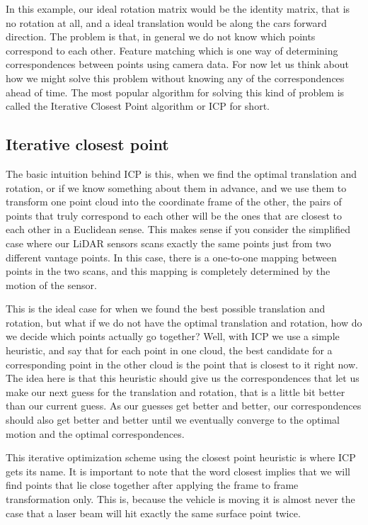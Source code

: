 In this example, our ideal rotation matrix would be the identity matrix, that is no rotation at all, and a ideal translation would be along the cars forward direction. The problem is
that, in general we do not know which points
correspond to each other.  Feature matching which is one way of determining correspondences between
points using camera data. For now let us think
about how we might solve this problem without knowing any of the correspondences
ahead of time. The most popular algorithm for solving this kind of
problem is called the Iterative Closest Point
algorithm or ICP for short. 

\subsection{Iterative closest point}

The basic intuition behind ICP is this, when we find the optimal
translation and rotation, or if we know something
about them in advance, and we use them to transform one point cloud into the
coordinate frame of the other, the pairs of points that truly correspond to each other will be the ones that are closest to each other in a Euclidean sense. This makes sense if you consider the simplified case where our LiDAR sensors scans exactly the same points just from two different
vantage points. In this case, there is a one-to-one mapping between points
in the two scans, and this mapping is completely determined by the motion
of the sensor. 

This is  the ideal case for when we found the best possible
translation and rotation, but what if we do not have the optimal translation
and rotation, how do we decide which points
actually go together? Well, with ICP we use
a simple heuristic, and say that for
each point in one cloud, the best candidate for
a corresponding point in the other cloud is the point that is closest to it right now. The idea here is
that this heuristic should give us
the correspondences that let us make our next guess for the translation and rotation, that is a little bit better
than our current guess. As our guesses get
better and better, our correspondences should also get better and better until we eventually converge
to the optimal motion and the optimal correspondences. 

This iterative optimization scheme using the closest point heuristic
is where ICP gets its name. It is important to
note that the word closest implies that we
will find points that lie close together after applying the frame to
frame transformation only. This is, because the vehicle is moving it is almost never the case that a laser beam will hit exactly the same
surface point twice. 

